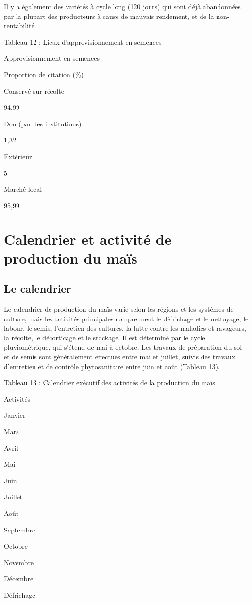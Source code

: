 \documentclass[12pt,oneside]{report}
\begin{document}
Il y a également des variétés à cycle long (120 jours) qui sont déjà abandonnées par la plupart des producteurs à cause de mauvais rendement, et de la non-rentabilité.

Tableau 12 : Lieux d’approvisionnement en semences

Approvisionnement en semences

Proportion de citation (\%)

Conservé sur récolte

94,99

Don (par des institutions)

1,32

Extérieur

5

Marché local

95,99

\section{Calendrier et activité de production du maïs}
\subsection{Le calendrier}
Le calendrier de production du maïs varie selon les régions et les systèmes de culture, mais les activités principales comprennent le défrichage et le nettoyage, le labour, le semis, l'entretien des cultures, la lutte contre les maladies et ravageurs, la récolte, le décorticage et le stockage. Il est déterminé par le cycle pluviométrique, qui s'étend de mai à octobre. Les travaux de préparation du sol et de semis sont généralement effectués entre mai et juillet, suivis des travaux d'entretien et de contrôle phytosanitaire entre juin et août (Tableau 13).

Tableau 13 : Calendrier exécutif des activités de la production du maïs

Activités

Janvier

Mars

Avril

Mai

Juin

Juillet

Août

Septembre

Octobre

Novembre

Décembre

Défrichage
\end{document}
